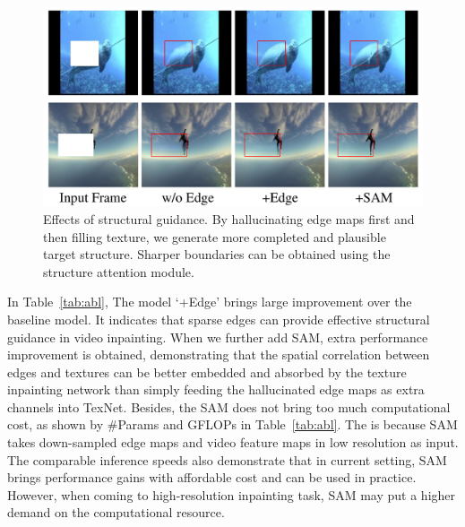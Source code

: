 \begin{figure}[t]
	\centering
	\includegraphics[width=0.97\columnwidth]{edgevis} %
	\caption{Effects of structural guidance. By hallucinating edge maps first and then filling texture, we generate more completed and plausible target structure. Sharper boundaries can be obtained using the structure attention module.}
	\label{edgevis}
\end{figure}



In Table~\ref{tab:abl}, The model `+Edge' brings large improvement over the baseline model.
It indicates that sparse edges can provide effective structural guidance in video inpainting. 
When we further add SAM, extra performance improvement is obtained, demonstrating that the spatial correlation between edges and textures can be better embedded and absorbed by the texture inpainting network than simply feeding the hallucinated edge maps as extra channels into TexNet. {\color{blue}Besides, the SAM does not bring too much computational cost, as shown by \#Params and GFLOPs in Table~\ref{tab:abl}. The is because SAM takes down-sampled edge maps and video feature maps in low resolution as input. The comparable inference speeds also demonstrate that in current setting, SAM brings performance gains with affordable cost and can be used in practice. However, when coming to high-resolution inpainting task, SAM may put a higher demand on the computational resource.}
 

